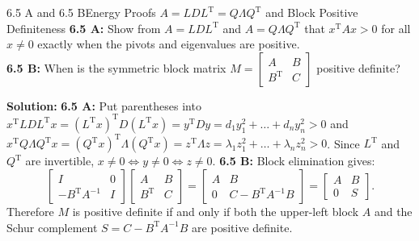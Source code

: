 \documentclass[11pt,a4paper,openany,oneside]{book}
\def\vect#1{#1}%
\def\mathbf#1{#1}%
\newcommand{\vect}[1]{\mathbf{#1}}
\newcommand{\T}{\mathrm{T}}
\numberwithin{equation}{chapter}
\begin{document}
\begin{example}{6.5 A and 6.5 B}{Energy Proofs $A = LDL^\T = Q\Lambda Q^\T$ and Block Positive Definiteness}
\textbf{6.5 A:} Show from $A = LDL^\T$ and $A = Q\Lambda Q^\T$ that $\vect{x}^\T A\vect{x} > 0$ for all $\vect{x} \neq \vect{0}$ exactly when the pivots and eigenvalues are positive.\\
\textbf{6.5 B:} When is the symmetric block matrix $M = \begin{bmatrix}A & B\\B^\T & C\end{bmatrix}$ positive definite?
\end{example}
\textbf{Solution:}
\textbf{6.5 A:} Put parentheses into $\vect{x}^\T LDL^\T\vect{x} = (L^\T\vect{x})^\T D(L^\T\vect{x}) = \vect{y}^\T D\vect{y} = d_1y_1^2 + \dots + d_ny_n^2 > 0$ and $\vect{x}^\T Q\Lambda Q^\T\vect{x} = (Q^\T\vect{x})^\T\Lambda(Q^\T\vect{x}) = \vect{z}^\T\Lambda\vect{z} = \lambda_1z_1^2 + \dots + \lambda_nz_n^2 > 0$. Since $L^\T$ and $Q^\T$ are invertible, $\vect{x} \neq \vect{0} \iff \vect{y} \neq \vect{0} \iff \vect{z} \neq \vect{0}$.
\textbf{6.5 B:} Block elimination gives:
\[
\begin{bmatrix} I & \vect{0} \\ -B^\T A^{-1} & I \end{bmatrix} \begin{bmatrix} A & B \\ B^\T & C \end{bmatrix} = \begin{bmatrix} A & B \\ \vect{0} & C - B^\T A^{-1}B \end{bmatrix} = \begin{bmatrix} A & B \\ \vect{0} & S \end{bmatrix}.
\]
Therefore $M$ is positive definite if and only if both the upper-left block $A$ and the Schur complement $S = C - B^\T A^{-1}B$ are positive definite.
\end{document}
